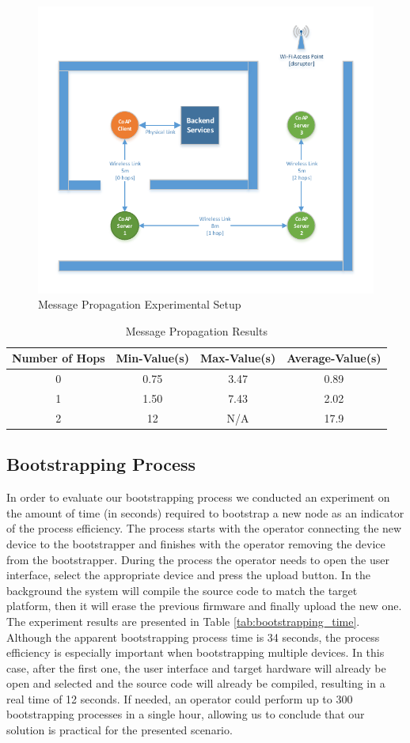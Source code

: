 \begin{figure}
  \centering
  \includegraphics[width=0.8\linewidth]{figures/PropagationExperiment.pdf}
  \caption{Message Propagation Experimental Setup}
  \label{fig:message_propagation_experiment}
\end{figure}

\begin{table}
\centering
\caption{Message Propagation Results}
\label{tab:message_propagation_results}
\begin{tabular}{|c|c|c|c|} \hline
Number of Hops&Min-Value(s)&Max-Value(s)&Average-Value(s)\\ \hline
0& 0.75& 3.47&0.89\\ \hline
1& 1.50& 7.43&2.02\\ \hline
2& 12& N/A&17.9\\ 
\hline\end{tabular}
\end{table}



\subsection{Bootstrapping Process}
In order to evaluate our bootstrapping process we conducted an experiment on the amount of time (in seconds) required to bootstrap a new node as an indicator of the process efficiency. The process starts with the operator connecting the new device to the bootstrapper and finishes with the operator removing the device from the bootstrapper. During the process the operator needs to open the user interface, select the appropriate device and press the upload button. In the background the system will compile the source code to match the target platform, then it will erase the previous firmware and finally upload the new one. The experiment results are presented in Table \ref{tab:bootstrapping_time}. Although the apparent bootstrapping process time is 34 seconds, the process efficiency is especially important when bootstrapping multiple devices. In this case, after the first one, the user interface and target hardware will already be open and selected and the source code will already be compiled, resulting in a real time of 12 seconds. If needed, an operator could perform up to 300 bootstrapping processes in a single hour, allowing us to conclude that our solution is practical for the presented scenario.

